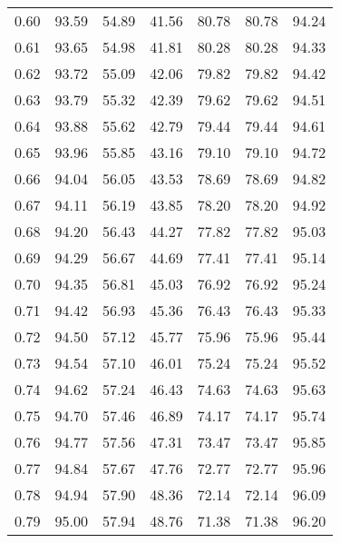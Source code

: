 \begin{tabular}{|c|c|c|c|c|c|c|}
      0.60 &     93.59 &     54.89 &      41.56 &   80.78 &      80.78 &         94.24 \\
      0.61 &     93.65 &     54.98 &      41.81 &   80.28 &      80.28 &         94.33 \\
      0.62 &     93.72 &     55.09 &      42.06 &   79.82 &      79.82 &         94.42 \\
      0.63 &     93.79 &     55.32 &      42.39 &   79.62 &      79.62 &         94.51 \\
      0.64 &     93.88 &     55.62 &      42.79 &   79.44 &      79.44 &         94.61 \\
      0.65 &     93.96 &     55.85 &      43.16 &   79.10 &      79.10 &         94.72 \\
      0.66 &     94.04 &     56.05 &      43.53 &   78.69 &      78.69 &         94.82 \\
      0.67 &     94.11 &     56.19 &      43.85 &   78.20 &      78.20 &         94.92 \\
      0.68 &     94.20 &     56.43 &      44.27 &   77.82 &      77.82 &         95.03 \\
      0.69 &     94.29 &     56.67 &      44.69 &   77.41 &      77.41 &         95.14 \\
      0.70 &     94.35 &     56.81 &      45.03 &   76.92 &      76.92 &         95.24 \\
      0.71 &     94.42 &     56.93 &      45.36 &   76.43 &      76.43 &         95.33 \\
      0.72 &     94.50 &     57.12 &      45.77 &   75.96 &      75.96 &         95.44 \\
      0.73 &     94.54 &     57.10 &      46.01 &   75.24 &      75.24 &         95.52 \\
      0.74 &     94.62 &     57.24 &      46.43 &   74.63 &      74.63 &         95.63 \\
      0.75 &     94.70 &     57.46 &      46.89 &   74.17 &      74.17 &         95.74 \\
      0.76 &     94.77 &     57.56 &      47.31 &   73.47 &      73.47 &         95.85 \\
      0.77 &     94.84 &     57.67 &      47.76 &   72.77 &      72.77 &         95.96 \\
      0.78 &     94.94 &     57.90 &      48.36 &   72.14 &      72.14 &         96.09 \\
      0.79 &     95.00 &     57.94 &      48.76 &   71.38 &      71.38 &         96.20 \\

\end{tabular}

